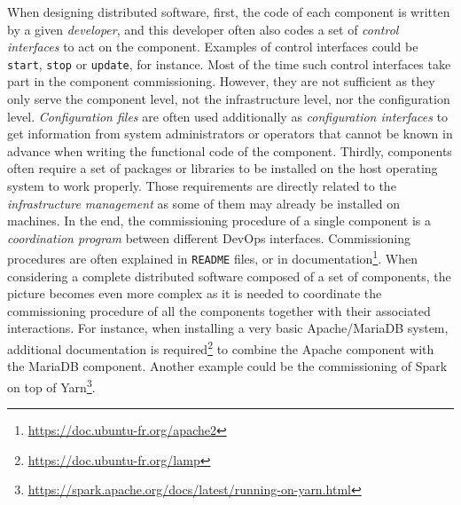 When designing distributed software, first, the code of each component
is written by a given \emph{developer}, and this developer often also
codes a set of \emph{control interfaces} to act on the
component. Examples of control interfaces could be \texttt{start},
\texttt{stop} or \texttt{update}, for instance. Most of the time such
control interfaces take part in the component commissioning. However,
they are not sufficient as they only serve the component level, not
the infrastructure level, nor the configuration
level. \emph{Configuration files} are often used additionally as
\emph{configuration interfaces} to get information from system
administrators or operators that cannot be known in advance when
writing the functional code of the component.  Thirdly, components
often require a set of packages or libraries to be installed on the
host operating system to work properly. Those requirements are
directly related to the \emph{infrastructure management} as some of
them may already be installed on machines.
In the end, the commissioning procedure of a single component is a
\emph{coordination program} between different DevOps
interfaces. Commissioning procedures are often explained in
\texttt{README} files, or in
documentation\footnote{\url{https://doc.ubuntu-fr.org/apache2}}.
%
%
When considering a complete distributed software composed of a set of
components, the picture becomes even more complex as it is needed to
coordinate the commissioning procedure of all the components together
with their associated interactions. For instance, when installing a
very basic Apache/MariaDB system, additional documentation is
required\footnote{\url{https://doc.ubuntu-fr.org/lamp}}
to combine the Apache component with the MariaDB component. Another
example could be the commissioning of Spark on top of
Yarn\footnote{\url{https://spark.apache.org/docs/latest/running-on-yarn.html}}.


